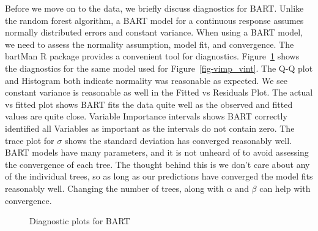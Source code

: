 \documentclass[
  12pt,
  letterpaper,
  DIV=11,
  numbers=noendperiod]{scrartcl}
\begin{document}
Before we move on to the data, we briefly discuss diagnostics for BART.
Unlike the random forest algorithm, a BART model for a continuous
response assumes normally distributed errors and constant variance. When
using a BART model, we need to assess the normality assumption, model
fit, and convergence. The bartMan R package \cite{bartMan} provides a
convenient tool for diagnostics. Figure~\ref{fig-bart_diag} shows the
diagnostics for the same model used for Figure~\ref{fig-vimp_vint}. The
Q-Q plot and Histogram both indicate normality was reasonable as
expected. We see constant variance is reasonable as well in the Fitted
vs Residuals Plot. The actual vs fitted plot shows BART fits the data
quite well as the observed and fitted values are quite close. Variable
Importance intervals shows BART correctly identified all Variables as
important as the intervals do not contain zero. The trace plot for
\(\sigma\) shows the standard deviation has converged reasonably well.
BART models have many parameters, and it is not unheard of to avoid
assessing the convergence of each tree. The thought behind this is we
don't care about any of the individual trees, so as long as our
predictions have converged the model fits reasonably well. Changing the
number of trees, along with \(\alpha\) and \(\beta\) can help with
convergence.

\begin{figure}[H]


\caption{\label{fig-bart_diag}Diagnostic plots for BART}

\end{figure}%
\end{document}
